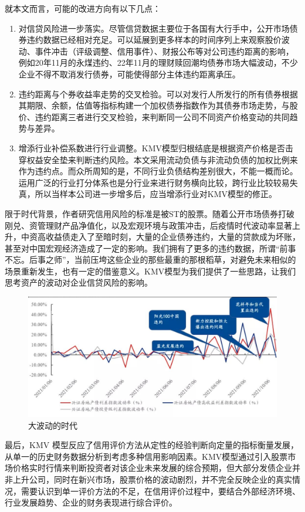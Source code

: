 \documentclass[a4paper,12pt]{ctexart}
\begin{document}
就本文而言，可能的改进方向有以下几点：
\begin{enumerate}
    \item 对信贷风险进一步落实。尽管信贷数据主要位于各国有大行手中，公开市场债券违约数据已经相对充足。可以延展到更多样本的时间序列上来观察股价波动、事件冲击（评级调整、信用事件）、财报公布等对公司违约距离的影响，例如20年11月的永煤违约、22年11月的理财赎回潮均债券市场大幅波动，不少企业不得不取消发行债券，可能使得部分主体违约距离承压。
    \item 违约距离与个券收益率走势的交叉检验。可以对发行人所发行的所有债券根据其期限、余额，估值等指标构建一个加权债券指数作为其债券市场走势，与股价、违约距离三者进行交叉检验，来判断同一公司不同资产价格变动的共同趋势与差异。
    \item 增添行业补偿系数进行行业调整。KMV模型归根结底是根据资产价格是否击穿权益安全垫来判断违约风险。本文采用流动负债与非流动负债的加权比例来作为违约点。而众所周知的是，不同行业负债结构差别很大，不能一概而论。运用广泛的行业打分体系也是分行业来进行财务横向比较，跨行业比较较易失真，所以当样本公司进一步增多后，应当增添行业对KMV模型的修正。
\end{enumerate}
限于时代背景，作者研究信用风险的标准是被ST的股票。随着公开市场债券打破刚兑、资管理财产品净值化，以及宏观环境与政策冲击，后疫情时代波动率显著上升，中资高收益债走入了至暗时刻，大量的企业债券违约，大量的贷款成为坏账，甚至对中国宏观经济造成了一定的影响。我们拥有了更多的违约数据，所谓“前事不忘。后事之师”，当前压垮这些企业的那些最重的那根稻草，对避免未来相似的场景重新发生，也有一定的借鉴意义。KMV模型为我们提供了一些思路，让我们思考资产的波动对企业信贷风险的影响。
\begin{figure}[H]
    \includegraphics[width=0.8\linewidth]{fig/波动率.jpeg}
    \caption{大波动的时代}
\end{figure}

最后，KMV 模型反应了信用评价方法从定性的经验判断向定量的指标衡量发展，从单一的历史财务数据分析到考虑多种信用影响因素。KMV模型通过引入股票市场价格实时行情来判断投资者对该企业未来发展的综合预期，但大部分发债企业并非上升公司，同时在新兴市场，股票价格的波动剧烈，并不完全反映企业的真实情况，需要认识到单一评价方法的不足，在信用评价过程中，要结合外部经济环境、行业发展趋势、企业的财务表现进行综合评价。

\nocite{*}
\appendix
\printbibliography%
\end{document}
